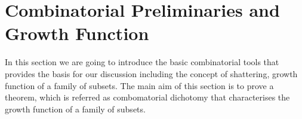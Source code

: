 \section{Combinatorial Preliminaries and Growth Function}\label{sec:combinatorial-preliminaries}

In this section we are going to introduce the basic combinatorial tools that provides the basis for our discussion including the concept of shattering, growth function of a family of subsets. The main aim of this section is to prove a theorem, which is referred as combomatorial dichotomy that characterises the growth function of a family of subsets.


